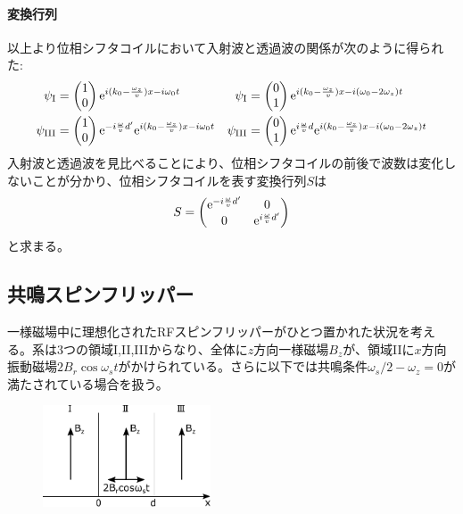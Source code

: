 \paragraph{変換行列}
以上より位相シフタコイルにおいて入射波と透過波の関係が次のように得られた:
\begin{align}
\psi_\mathrm{I}&= \begin{pmatrix} 1\\0 \end{pmatrix} \mathrm{e}^{i (k_0-\frac{\omega_z}{v}) x -i\omega_0 t} & \psi_\mathrm{I}&= \begin{pmatrix} 0\\1 \end{pmatrix} \mathrm{e}^{i (k_0-\frac{\omega_z}{v}) x -i(\omega_0-2\omega_z) t} \\
\psi_\mathrm{III}&=\begin{pmatrix} 1\\0 \end{pmatrix} \mathrm{e}^{-i\frac{\omega}{v}d'} \mathrm{e}^{i (k_0-\frac{\omega_z}{v})x -i\omega_0 t} & \psi_\mathrm{III}&=\begin{pmatrix} 0\\1 \end{pmatrix} \mathrm{e}^{i\frac{\omega}{v}d} \mathrm{e}^{i (k_0-\frac{\omega_z}{v}) x -i(\omega_0-2\omega_z) t}
\end{align}
入射波と透過波を見比べることにより、位相シフタコイルの前後で波数は変化しないことが分かり、位相シフタコイルを表す変換行列$S$は
\begin{equation}
S=\begin{pmatrix} \mathrm{e}^{-i\frac{\omega}{v}d'} & 0\\0 &\mathrm{e}^{i\frac{\omega}{v}d'} \end{pmatrix}
\end{equation}
と求まる。

\subsection{共鳴スピンフリッパー}
一様磁場中に理想化されたRFスピンフリッパーがひとつ置かれた状況を考える。系は3つの領域I,II,IIIからなり、全体に$z$方向一様磁場$B_z$が、領域IIに$x$方向振動磁場$2B_r \cos \omega_s t$がかけられている。さらに以下では共鳴条件$\omega_s/2-\omega_z=0$が満たされている場合を扱う。
\begin{figure}[H]
\centering
\includegraphics[height=3cm]{matrix/spinflipper.pdf}
\end{figure}

